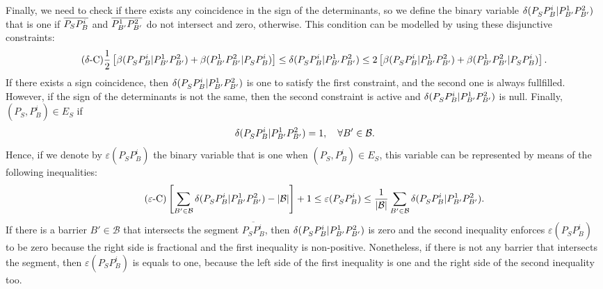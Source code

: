 \documentclass[a4paper]{elsarticle}
\newcommand{\B}{{\mathcal B}}
\newcommand{\ES}{{E^{}_{S}}}
\begin{document}
Finally, we need to check if there exists any coincidence in the sign of the determinants, so we define the binary variable $\delta(P_S^{}P_B^i|P_{B'}^1P_{B'}^2)$ that is one if $\overline{P_SP_B^i}$ and $\overline{P_{B'}^1P_{B'}^2}$ do not intersect and zero, otherwise. This condition can be modelled by using these disjunctive constraints:
\begin{equation*}\tag{$\delta$-C}\label{eq:deltaC}
\frac{1}{2}\left[\beta(P_S^{}P_B^i|P_{B'}^1P_{B'}^2)+\beta(P_{B'}^1P_{B'}^2|P_S^{}P_B^i)\right]\leq\delta(P_S^{}P_B^i|P_{B'}^1P_{B'}^2)\leq 2\left[\beta(P_S^{}P_B^i|P_{B'}^1P_{B'}^2)+\beta(P_{B'}^1P_{B'}^2|P_S^{}P_B^i)\right].
\end{equation*}
If there exists a sign coincidence, then $\delta(P_S^{}P_B^i|P_{B'}^1P_{B'}^2)$ is one to satisfy the first constraint, and the second one is always fullfilled. However, if the sign of the determinants is not the same, then the second constraint is active and $\delta(P_S^{}P_B^i|P_{B'}^1P_{B'}^2)$ is null. Finally, $(P^{}_S,P_B^i)\in\ES$ if
\newcommand{\varepsilonvar}[2]{\varepsilon(#1#2)}
$$\deltacheck{P^{}_S}{P_B^i}{P^1_{B'}}{P^2_{B'}}=1,\quad\forall B'\in\B.$$
Hence, if we denote by $\varepsilonvar{P^{}_S}{P_B^i}$ the binary variable that is one when $(P^{}_S,P_B^i)\in\ES$, this variable can be represented by means of the following inequalities:
\begin{equation*}\tag{$\varepsilon$-C}\label{eq:varepsilonC}
\left[\sum_{B'\in\mathcal B}\deltacheck{P^{}_S}{P_B^i}{P^1_{B'}}{P^2_{B'}}-|\mathcal B|\right] + 1\leq \varepsilonvar{P^{}_S}{P_B^i}\leq \frac{1}{|\B|}\sum_{B'\in\mathcal B}\deltacheck{P^{}_S}{P_B^i}{P^1_{B'}}{P^2_{B'}}.
\end{equation*}
If there is a barrier $B'\in\B$ that intersects the segment $\overline{P^{}_SP_B^i}$, then $\delta(P^{}_SP_B^i|P^1_{B'}P^2_{B'})$ is zero and the second inequality enforces $\varepsilonvar{P^{}_S}{P_B^i}$ to be zero because the right side is fractional and the first inequality is non-positive. Nonetheless, if there is not any barrier that intersects the segment, then $\varepsilonvar{P^{}_S}{P_B^i}$ is equals to one, because the left side of the first inequality is one and the right side of the second inequality too.
\end{document}
